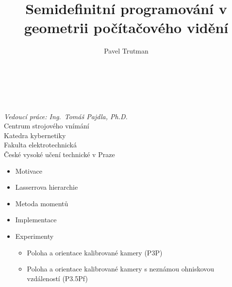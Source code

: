 \documentclass[cmpiitalkstyle, 22pt]{cmptalk}
\author{Pavel Trutman}
\affiliation{Centrum strojového vnímání}
\title{Semidefinitní programování v geometrii počítačového vidění}
\begin{document}
\fontsize{22pt}{26.4pt}\selectfont
\bigfigfalse
\begin{talktitlepage}
  {\fontsize{26pt}{31.2pt}\selectfont
  \mbox{}\\
  {\LARGE\bfseries \thetitle }\\[\baselineskip]
  \theauthor \\[\baselineskip]
  \textit{Vedoucí práce: Ing.\ Tomáš Pajdla, Ph.D.}
  \vfill
  \thetalklogo\\[1cm]
  Centrum strojového vnímání\\
  Katedra kybernetiky\\
  Fakulta elektrotechnická\\
  České vysoké učení technické v Praze
  \vspace{2cm}
  }
\end{talktitlepage}

\begin{cmptalkslide}[Obsah]
  \begin{itemize}
    \item Motivace
    \item Lasserrova hierarchie
    \item Metoda momentů
    \item Implementace
    \item Experimenty
    \begin{itemize}
      \item Poloha a orientace kalibrované kamery (P3P)
      \item Poloha a orientace kalibrované kamery s neznámou ohniskovou vzdáleností (P3.5Pf)
    \end{itemize}
  \end{itemize}
\end{cmptalkslide}
\end{document}
